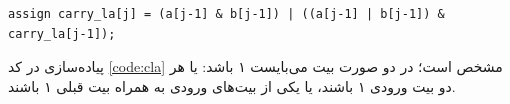 \documentclass{article}
\begin{document}
\begin{LTR}
\begin{lstlisting}[caption={\rl{پیاده‌سازی \lr{Carry-Lookahead}}​},label=code:cla,style=verilog]
assign carry_la[j] = (a[j-1] & b[j-1]) | ((a[j-1] | b[j-1]) & carry_la[j-1]);
\end{lstlisting}
\end{LTR}
\noindent
پیاده‌سازی  در کد \ref{code:cla} مشخص است؛ در دو صورت بیت  می‌بایست ۱ باشد: یا هر دو بیت ورودی ۱ باشند، یا یکی از بیت‌های ورودی به همراه بیت  قبلی ۱ باشند.

\subsection{}




%

\noindent
\end{document}
